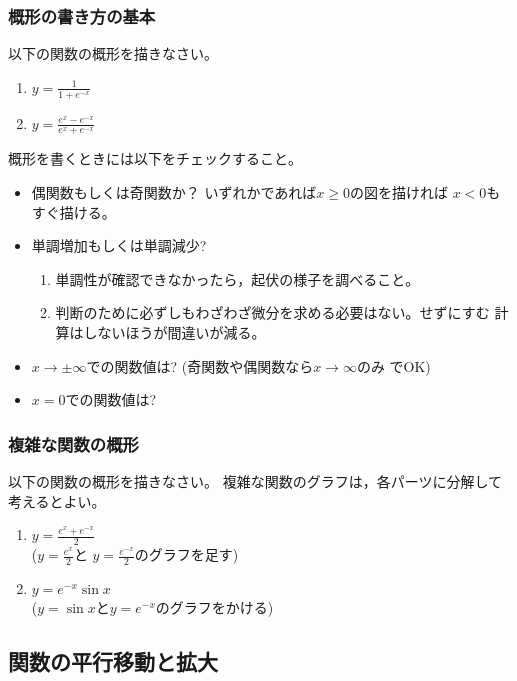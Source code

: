 \documentclass[twocolumn,11pt]{jarticle}
\begin{document}
\subsubsection{概形の書き方の基本}
以下の関数の概形を描きなさい。
\begin{enumerate}
\item $\displaystyle y=\frac{1}{1+e^{-x}}$
\item $\displaystyle y=\frac{e^x-e^{-x}}{e^x+e^{-x}}$\label{eq:tanh}
\end{enumerate}
\comment
概形を書くときには以下をチェックすること。
\begin{itemize}
\item 偶関数もしくは奇関数か？ いずれかであれば$x\ge 0$の図を描ければ
  $x<0$もすぐ描ける。
\item 単調増加もしくは単調減少?
  \begin{enumerate}
  \item 単調性が確認できなかったら，起伏の様子を調べること。
  \item 判断のために必ずしもわざわざ微分を求める必要はない。せずにすむ
  計算はしないほうが間違いが減る。
  \end{enumerate}
\item $x\to\pm\infty$での関数値は? (奇関数や偶関数なら$x\to\infty$のみ
  でOK)
\item $x=0$での関数値は?
\end{itemize}

\subsubsection{複雑な関数の概形}
以下の関数の概形を描きなさい。
複雑な関数のグラフは，各パーツに分解して考えるとよい。
\begin{enumerate}
\item $\displaystyle y=\frac{e^x+e^{-x}}{2}$
  \\($\displaystyle y=\frac{e^x}{2}$と
  $\displaystyle y=\frac{e^{-x}}{2}$のグラフを足す)
\item $y=e^{-x}\sin x$
  \\($y=\sin x$と$y=e^{-x}$のグラフをかける)
\end{enumerate}

\subsection{関数の平行移動と拡大}
\end{document}
